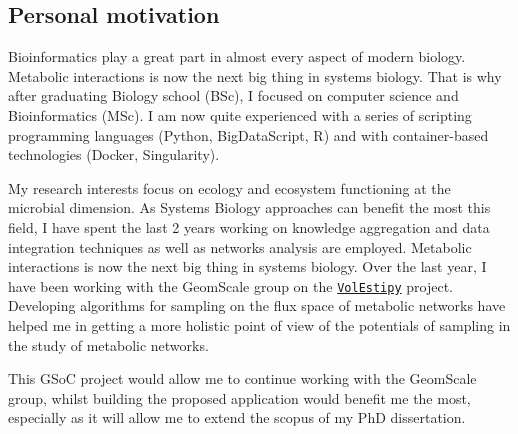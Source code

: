 \documentclass{article}
\begin{document}
\subsection{Personal motivation}

Bioinformatics play a great part in almost every aspect of modern biology.
Metabolic interactions \cite{cai2020predicting} is now the next big thing in systems biology. 
That is why after graduating Biology school (BSc), I focused on computer science and Bioinformatics (MSc). 
I am now quite experienced with a series of scripting programming languages (Python, BigDataScript, R) and with container-based technologies (Docker, Singularity).  


My research interests focus on ecology and ecosystem functioning at the microbial dimension.
As Systems Biology approaches can benefit the most this field, 
I have spent the last 2 years working on 
knowledge aggregation and data integration techniques as well as networks analysis are employed. 
Metabolic interactions \cite{cai2020predicting} is now the next big thing in systems biology. 
Over the last year, I have been working with the GeomScale group on the \href{https://github.com/GeomScale/volume_approximation}{\texttt{VolEstipy}} project.
Developing algorithms for sampling on the flux space of metabolic networks have 
helped me in getting a more holistic point of view of the potentials of sampling in the study of metabolic networks. 

This GSoC project would allow me to continue working with the GeomScale group, 
whilst building the proposed application would benefit me the most, 
especially as it will allow me to extend the scopus of my PhD dissertation.

\end{document}
